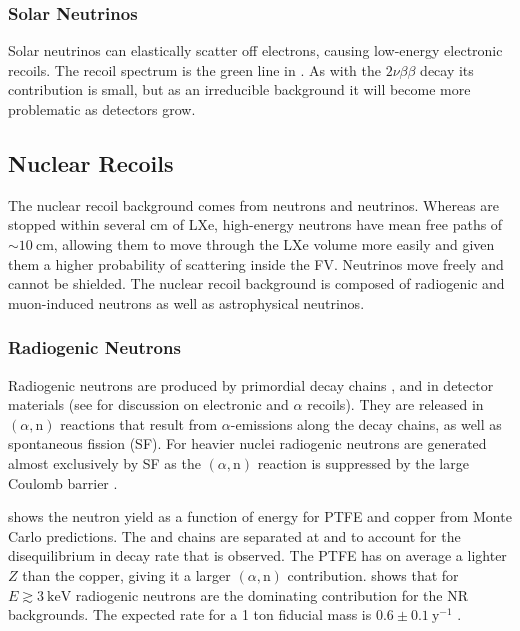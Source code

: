 \subsubsection{Solar Neutrinos}
\label{subsubsec:backgrounds_electronic_solar_neutrinos}
Solar neutrinos can elastically scatter off electrons, causing low-energy electronic recoils.  The recoil spectrum is the green line in
.  As with the  $2 \nu \beta \beta$
decay its contribution is small, but as an irreducible background it will become more problematic as detectors grow.



\subsection{Nuclear Recoils}
\label{subsec:backgrounds_nuclear}
The nuclear recoil background comes from neutrons and neutrinos.  Whereas \gammarays are stopped within several cm of LXe, high-energy
neutrons have mean free paths of ${\sim}10\ \mathrm{cm}$, allowing them to move through the LXe volume more easily and given them a higher
probability of scattering inside the FV.  Neutrinos move freely and cannot be shielded.  The nuclear recoil background is composed of
radiogenic and muon-induced neutrons as well as astrophysical neutrinos.



\subsubsection{Radiogenic Neutrons}
\label{subsubsec:backgrounds_nuclear_radiogenic}
Radiogenic neutrons are produced by primordial decay chains ,  and  in detector materials
(see  for discussion on electronic and $\alpha$ recoils).  They are released in
$(\alpha, \mathrm{n})$ reactions that result from $\alpha$-emissions along the decay chains, as well as spontaneous fission (SF).  For
heavier nuclei radiogenic neutrons are generated almost exclusively by SF as the $(\alpha, \mathrm{n})$ reaction is suppressed by the
large Coulomb barrier .

 shows the neutron yield as a function of energy for PTFE and copper from Monte Carlo
predictions.  The  and  chains are
separated at  and  to account for the disequilibrium in decay rate
that is observed.  The PTFE has on average a lighter $Z$ than the copper, giving it a larger $(\alpha, \mathrm{n})$
contribution.   shows that for $E \gtrsim 3\ \mathrm{keV}$
radiogenic neutrons are the dominating contribution for the NR backgrounds.  The expected rate for a 1 ton fiducial mass is
$0.6 \pm 0.1\ \mathrm{y^{-1}}$ .

